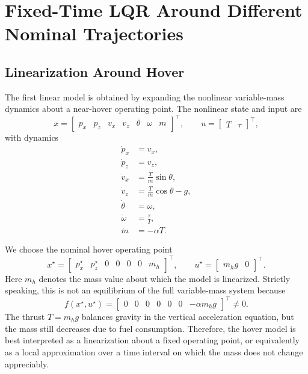 \section{Fixed-Time LQR Around Different Nominal Trajectories}
\label{sec:part1_lqr}

\subsection{Linearization Around Hover}
\label{subsec:hover_linearization}

The first linear model is obtained by expanding the nonlinear variable-mass dynamics about a near-hover operating point.  The nonlinear state and input are
\[
    x = \begin{bmatrix} p_x & p_z & v_x & v_z & \theta & \omega & m \end{bmatrix}^\top,
    \qquad
    u = \begin{bmatrix} T & \tau \end{bmatrix}^\top,
\]
with dynamics
\begin{align*}
    \dot p_x &= v_x, \\
    \dot p_z &= v_z, \\
    \dot v_x &= \frac{T}{m}\sin\theta, \\
    \dot v_z &= \frac{T}{m}\cos\theta - g, \\
    \dot \theta &= \omega, \\
    \dot \omega &= \frac{\tau}{I}, \\
    \dot m &= -\alpha T.
\end{align*}

We choose the nominal hover operating point
\[
    x^\star =
    \begin{bmatrix}
        p_x^\star & p_z^\star & 0 & 0 & 0 & 0 & m_h
    \end{bmatrix}^\top,
    \qquad
    u^\star =
    \begin{bmatrix}
        m_h g & 0
    \end{bmatrix}^\top.
\]
Here $m_h$ denotes the mass value about which the model is linearized.  Strictly speaking, this is not an equilibrium of the full variable-mass system because
\[
    f(x^\star,u^\star)
    =
    \begin{bmatrix}
        0 & 0 & 0 & 0 & 0 & 0 & -\alpha m_h g
    \end{bmatrix}^\top
    \neq 0.
\]
The thrust $T=m_hg$ balances gravity in the vertical acceleration equation, but the mass still decreases due to fuel consumption.  Therefore, the hover model is best interpreted as a linearization about a fixed operating point, or equivalently as a local approximation over a time interval on which the mass does not change appreciably.

